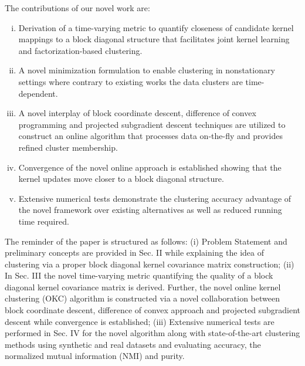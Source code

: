 \documentclass[10pt,final]{IEEEtran}
\begin{document}
The contributions of our novel work are: 
\begin{enumerate}[(i).]
    \item Derivation of a time-varying metric to quantify closeness of candidate kernel mappings to a block diagonal structure that facilitates joint  kernel learning and factorization-based clustering. 
    \item A novel minimization formulation to enable clustering in nonstationary settings where contrary to existing works \cite{SPMKC,tkmgc,DCA} the data clusters are time-dependent. 
    \item A novel interplay of block coordinate descent, difference of convex programming and projected subgradient descent techniques are utilized to construct an online algorithm that processes data on-the-fly and provides refined cluster membership. 
    \item Convergence of the novel online approach is established showing that the kernel updates move closer to a block diagonal structure.  
    \item Extensive numerical tests demonstrate the clustering accuracy advantage of the novel framework over existing alternatives as well as reduced running time required.
\end{enumerate}

The reminder of the paper is structured as follows: (i) Problem Statement and preliminary concepts are provided in Sec. II while explaining the idea of clustering via a proper block diagonal kernel covariance matrix construction; (ii) In Sec. III the novel time-varying metric quantifying the quality of a block diagonal kernel covariance matrix is derived. Further, the novel online kernel clustering (OKC) algorithm is constructed via a novel collaboration between block coordinate descent, difference of convex approach and projected subgradient descent while convergence is established; (iii) Extensive numerical tests are performed in Sec. IV for the novel algorithm along with state-of-the-art clustering methods using synthetic and real datasets and evaluating accuracy, the normalized mutual information (NMI) and purity. 
\end{document}
